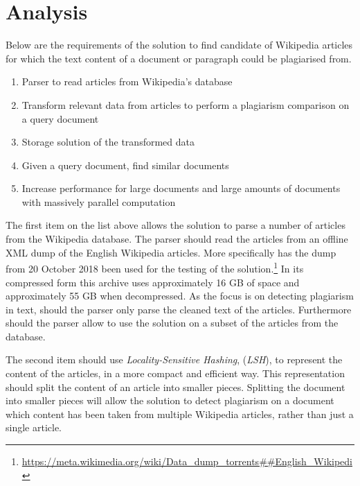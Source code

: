 \section{Analysis}

Below are the requirements of the solution to find candidate of Wikipedia articles for which the text content of a document or paragraph could be plagiarised from.

\begin{enumerate}
    \item Parser to read articles from Wikipedia's database
    \item Transform relevant data from articles to perform a plagiarism comparison on a query document
    \item Storage solution of the transformed data
    \item Given a query document, find similar documents
    \item Increase performance for large documents and large amounts of documents with massively parallel computation
\end{enumerate}


The first item on the list above allows the solution to parse a number of articles from the Wikipedia database. The parser should read the articles from an offline XML dump of the English Wikipedia articles. More specifically has the dump from 20 October 2018 been used for the testing of the solution.\footnote{\url{https://meta.wikimedia.org/wiki/Data_dump_torrents##English_Wikipedi}} In its compressed form this archive uses approximately 16 GB of space and approximately 55 GB when decompressed. As the focus is on detecting plagiarism in text, should the parser only parse the cleaned text of the articles. Furthermore should the parser allow to use the solution on a subset of the articles from the database.

The second item should use \emph{Locality-Sensitive Hashing}, (\emph{LSH}), to represent the content of the articles, in a more compact and efficient way. This representation should split the content of an article into smaller pieces. Splitting the document into smaller pieces will allow the solution to detect plagiarism on a document which content has been taken from multiple Wikipedia articles, rather than just a single article.


